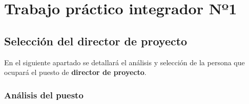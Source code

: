 \section{Trabajo práctico integrador Nº1}
\subsection{Selección del director de proyecto}
En el siguiente apartado se detallará el análisis y selección de la persona que ocupará el puesto de \textbf{director de proyecto}.

\subsubsection{Análisis del puesto}

